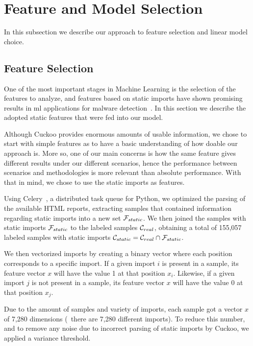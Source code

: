 \color{black}
\section{Feature and Model Selection}\label{sec:feature_model}

In this subsection we describe our approach to feature selection and linear model choice.

\subsection{Feature Selection}
\label{section:feature_selection}

One of the most important stages in Machine Learning is the selection of the features to analyze, and features based on static imports have shown promising results in \gls{ml} applications for malware detection~\cite{miller:rev_int,schultz:data_mining}. 
In this section we describe the adopted static features that were fed into our model.

Although Cuckoo provides enormous amounts of usable information, we chose to start with simple features as to have a basic understanding of how doable our approach is.
More so, one of our main concerns is how the same feature gives different results under our different scenarios, hence the performance between scenarios and methodologies is more relevant than absolute performance.
With that in mind, we chose to use the static imports as features.

Using Celery~\cite{tool:celery}, a distributed task queue for Python, we optimized the parsing of the available HTML reports, extracting samples that contained information regarding static imports into a new set $\mathcal{F}_{static}$.
We then joined the samples with static imports $\mathcal{F}_{static}$ to the labeled samples $\mathcal{C}_{real}$, obtaining a total of 155,057 labeled samples with static imports $\mathcal{C}_{static} = \mathcal{C}_{real} \cap \mathcal{F}_{static}$.

We then vectorized imports by creating a binary vector where each position corresponds to a specific import.
If a given import $i$ is present in a sample, its feature vector $x$ will have the value 1 at that position $x_i$.
Likewise, if a given import $j$ is not present in a sample, its feature vector $x$ will have the value 0 at that position $x_j$.

Due to the amount of samples and variety of imports, each sample got a vector $x$ of 7,280 dimensions (\ie\ there are 7,280 different imports).
To reduce this number, and to remove any noise due to incorrect parsing of static imports by Cuckoo, we applied a variance threshold.

